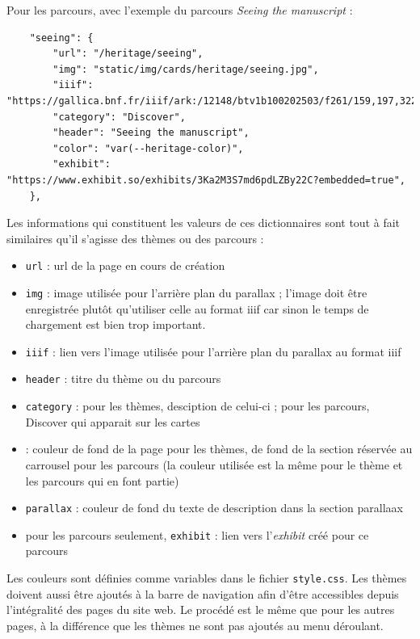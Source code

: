     Pour les parcours, avec l'exemple du parcours \textit{Seeing the manuscript} : 
    
    \begin{verbatim}
    "seeing": {
        "url": "/heritage/seeing",
        "img": "static/img/cards/heritage/seeing.jpg",
        "iiif": "https://gallica.bnf.fr/iiif/ark:/12148/btv1b100202503/f261/159,197,322,555/800,/0/native.jpg",
        "category": "Discover",
        "header": "Seeing the manuscript",
        "color": "var(--heritage-color)",
        "exhibit": "https://www.exhibit.so/exhibits/3Ka2M3S7md6pdLZBy22C?embedded=true",
    },
    \end{verbatim}
    
    Les informations qui constituent les valeurs de ces dictionnaires sont tout à fait similaires qu'il s'agisse des thèmes ou des parcours : 
    \begin{itemize}
    \item \texttt{url} : \acrshort{url} de la page en cours de création
    \item \texttt{img} : image utilisée pour l'arrière plan du parallax ; l'image doit être enregistrée plutôt qu'utiliser celle au format \acrshort{iiif} car sinon le temps de chargement est bien trop important.
    \item \texttt{iiif} : lien vers l'image utilisée pour l'arrière plan du parallax au format \acrshort{iiif}
    \item \texttt{header} : titre du thème ou du parcours
    \item \texttt{category} : pour les thèmes, desciption de celui-ci ; pour les parcours, \og{}Discover\fg{} qui apparait sur les cartes
    \item {} : couleur de fond de la page pour les thèmes, de fond de la section réservée au carrousel pour les parcours (la couleur utilisée est la même pour le thème et les parcours qui en font partie)
    \item \texttt{parallax} : couleur de fond du texte de description dans la section parallaax
    \item pour les parcours seulement, \texttt{exhibit} : lien vers l'\textit{exhibit} créé pour ce parcours
    \end{itemize} 
    
    Les couleurs sont définies comme variables dans le fichier \texttt{style.css}. Les thèmes doivent aussi être ajoutés à la barre de navigation afin d'être accessibles depuis l'intégralité des pages du site web. Le procédé est le même que pour les autres pages, à la différence que les thèmes ne sont pas ajoutés au menu déroulant. 
    
